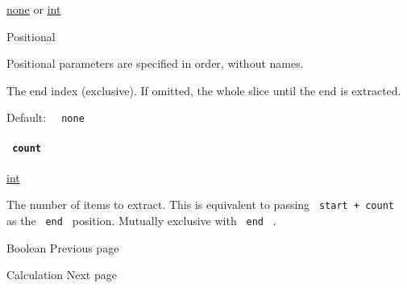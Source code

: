\href{/docs/reference/foundations/none/}{none} {or}
\href{/docs/reference/foundations/int/}{int}

{{ Positional }}

\label{definitions-slice-end-positional-tooltip}
Positional parameters are specified in order, without names.

The end index (exclusive). If omitted, the whole slice until the end is
extracted.

Default: \texttt{\ }{\texttt{\ none\ }}\texttt{\ }

\paragraph{\texorpdfstring{\texttt{\ count\ }}{ count }}\label{definitions-slice-count}

\href{/docs/reference/foundations/int/}{int}

The number of items to extract. This is equivalent to passing
\texttt{\ start\ +\ count\ } as the \texttt{\ end\ } position. Mutually
exclusive with \texttt{\ end\ } .

\href{/docs/reference/foundations/bool/}{\pandocbounded{}}

{ Boolean } { Previous page }

\href{/docs/reference/foundations/calc/}{\pandocbounded{}}

{ Calculation } { Next page }
